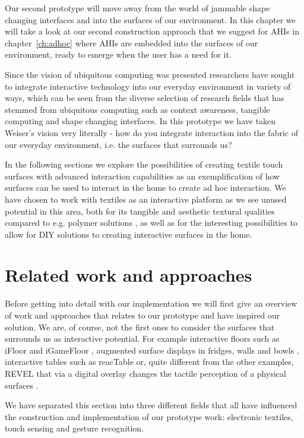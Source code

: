 Our second prototype will move away from the world of jammable shape changing interfaces and into the surfaces of our environment.
In this chapter we will take a look at our second construction approach that we suggest for AHIs in chapter~\ref{ch:adhoc} where AHIs are embedded into the surfaces of our environment, ready to emerge when the user has a need for it.

Since the vision of ubiquitous computing was presented researchers have sought to integrate interactive technology into our everyday environment in variety of ways, which can be seen from the diverse selection of research fields that has stemmed from ubiquitous computing such as context awareness, tangible computing and shape changing interfaces.
In this prototype we have taken Weiser's vision very literally - how do you integrate interaction into the fabric of our everyday environment, i.e. the surfaces that surrounds us?

In the following sections we explore the possibilities of creating textile touch surfaces with advanced interaction capabilities as an exemplification of how surfaces can be used to interact in the home to create ad hoc interaction.
We have chosen to work with textiles as an interactive platform as we see unused potential in this area, both for its tangible and aesthetic textural qualities compared to e.g. polymer solutions \cite{rosenberg2009unmousepad}, as well as for the interesting possibilities to allow for DIY solutions to creating interactive surfaces in the home.

\section{Related work and approaches}
Before getting into detail with our implementation we will first give an overview of work and approaches that relates to our prototype and have inspired our solution.
We are, of course, not the first ones to consider the surfaces that surrounds us as interactive potential.
For example interactive floors such as iFloor \citep{petersen2005floor} and  iGameFloor \citep{gronbaek2007igamefloor}, augmented surface displays in fridges, walls and bowls \citep{taylor2007homes}, interactive tables such as reacTable \citep{jorda2007reactable} or, quite different from the other examples, REVEL that via a digital overlay changes the tactile perception of a physical surfaces \citep{bau2013revel}.

We have separated this section into three different fields that all have influenced the construction and implementation of our prototype work: electronic textiles, touch sensing and gesture recognition.
 
